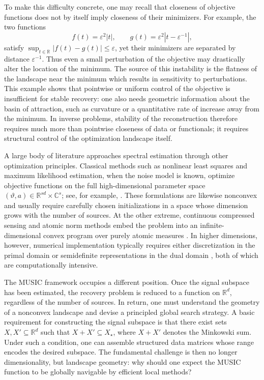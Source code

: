 \documentclass[11pt]{article}
\theoremstyle{definition}
\numberwithin{theorem}{section}
\numberwithin{lemma}{section}
\numberwithin{equation}{section}
\def\C{\mathbb{C}}
\def\R{\mathbb{R}}
\renewcommand{\subset}{\subseteq}
\renewcommand{\epsilon}{\varepsilon}
\newcommand{\bfa}{a}
\numberwithin{equation}{section}
\begin{document}
To make this difficulty concrete, one may recall that closeness of objective functions does not by itself imply closeness of their minimizers. For example, the two functions
\[
f(t)=\epsilon^2|t|,
\qquad
g(t)=\epsilon^2|t-\epsilon^{-1}|,
\]
satisfy $\sup_{t\in\R}|f(t)-g(t)|\le \epsilon$, yet their minimizers are separated by distance $\epsilon^{-1}$. Thus even a small perturbation of the objective may drastically alter the location of the minimum. 
The source of this instability is the flatness of the landscape near the minimum which results in sensitivity to perturbations. This example shows that pointwise or uniform control of the objective is insufficient for stable recovery: one also needs geometric information about the basin of attraction, such as curvature or a quantitative rate of increase away from the minimum.
 In inverse problems, stability of the reconstruction therefore requires much more than pointwise closeness of data or functionals; it requires structural control of the optimization landscape itself.

A large body of literature approaches spectral estimation through other optimization principles. Classical methods such as nonlinear least squares and maximum likelihood estimation, when the noise model is known, optimize objective functions on the full high-dimensional parameter space $(\vartheta,\bfa)\in \R^{sd}\times \C^s$; see, for example, \cite{stoica2002maximum,traonmilin2020basins}. These formulations are likewise nonconvex and usually require carefully chosen initializations in a space whose dimension grows with the number of sources. At the other extreme, continuous compressed sensing and atomic norm methods embed the problem into an infinite-dimensional convex program over purely atomic measures \cite{candes2014towards}. In higher dimensions, however, numerical implementation typically requires either discretization in the primal domain or semidefinite representations in the dual domain \cite{de2016exact,poon2019multidimensional,poon2023geometry}, both of which are computationally intensive.

The MUSIC framework occupies a different position. Once the signal subspace has been estimated, the recovery problem is reduced to a function on $\R^d$, regardless of the number of sources. In return, one must understand the geometry of a nonconvex landscape and devise a principled global search strategy. A basic requirement for constructing the signal subspace is that there exist sets $X,X'\subset \R^d$ such that $X+X'\subset X_\star$, where $X+X'$ denotes the Minkowski sum. Under such a condition, one can assemble structured data matrices whose range encodes the desired subspace. The fundamental challenge is then no longer dimensionality, but landscape geometry: why should one expect the MUSIC function to be globally navigable by efficient local methods?
\end{document}

